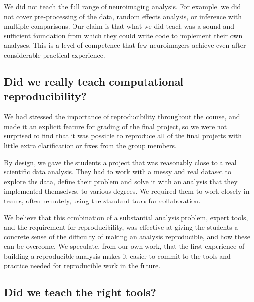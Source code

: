 We did not teach the full range of neuroimaging analysis.  For example, we did
not cover pre-processing of the data, random effects analysis, or inference
with multiple comparisons.   Our claim is that what we did teach was a sound
and sufficient foundation from which they could write code to implement their
own analyses.  This is a level of competence that few neuroimagers achieve
even after considerable practical experience.

\subsection{Did we really teach computational reproducibility?}

We had stressed the importance of reproducibility throughout the course, and
made it an explicit feature for grading of the final project, so we were not
surprised to find that it was possible to reproduce all of the final projects
with little extra clarification or fixes from the group members.

By design, we gave the students a project that was reasonably close to a real
scientific data analysis.  They had to work with a messy and real dataset to
explore the data, define their problem and solve it with an analysis that they
implemented themselves, to various degrees.  We required them to work closely
in teams, often remotely, using the standard tools for collaboration.

We believe that this combination of a substantial analysis problem, expert
tools, and the requirement for reproducibility, was effective at giving the
students a concrete sense of the difficulty of making an analysis
reproducible, and how these can be overcome.  We speculate, from our own work,
that the first experience of building a reproducible analysis makes it easier
to commit to the tools and practice needed for reproducible work in the
future.


\subsection{Did we teach the right tools?}

